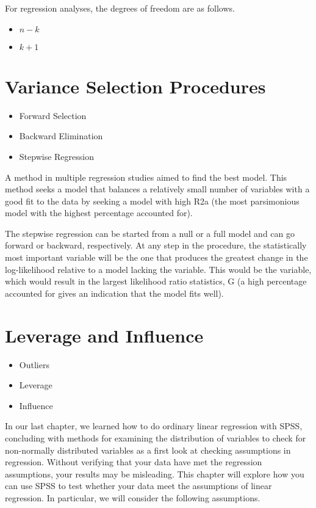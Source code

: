 For regression analyses, the degrees of freedom are as follows.
\begin{itemize}
\item $n-k$
\item $k+1$
\end{itemize}

\newpage
\section{Variance Selection Procedures}
\begin{itemize}
\item Forward Selection
\item Backward Elimination
\item Stepwise Regression
\end{itemize}

A method in multiple regression studies aimed to find the best model. This method seeks a model that balances a relatively small number of variables with a good fit to the data by seeking a model with high R2a (the most parsimonious model with the highest percentage accounted for).

The stepwise regression can be started from a null or a full model and can go forward or backward, respectively. At any step in the procedure, the statistically most important variable will be the one that produces the greatest change in the log-likelihood relative to a model lacking the variable. This would be the variable, which would result in the largest likelihood ratio statistics, G (a high percentage accounted for gives an indication that the model fits well).


\section{Leverage and Influence}
\begin{itemize}
\item Outliers
\item Leverage
\item Influence
\end{itemize}

In our last chapter, we learned how to do ordinary linear regression with SPSS, concluding with methods for examining the distribution of variables to check for non-normally distributed variables as a first look at checking assumptions in regression.  Without verifying that your data have met the regression assumptions, your results may be misleading.  This chapter will explore how you can use SPSS to test whether your data meet the assumptions of linear regression.  In particular, we will consider the following assumptions.


